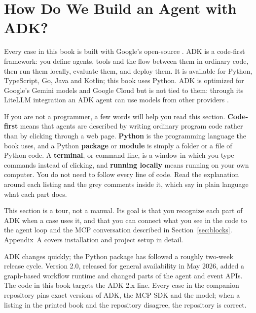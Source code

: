 
\section{How Do We Build an Agent with ADK?}
\label{sec:adk}

Every case in this book is built with Google's open-source . ADK is a code-first framework: you define agents, tools and the flow between them in ordinary code, then run them locally, evaluate them, and deploy them. It is available for Python, TypeScript, Go, Java and Kotlin; this book uses Python. ADK is optimized for Google's Gemini models and Google Cloud but is not tied to them: through its LiteLLM integration an ADK agent can use models from other providers \citep{adkdocs}.

If you are not a programmer, a few words will help you read this section. \textbf{Code-first} means that agents are described by writing ordinary program code rather than by clicking through a web page. \textbf{Python} is the programming language the book uses, and a Python \textbf{package} or \textbf{module} is simply a folder or a file of Python code. A \textbf{terminal}, or command line, is a window in which you type commands instead of clicking, and \textbf{running locally} means running on your own computer. You do not need to follow every line of code. Read the explanation around each listing and the grey comments inside it, which say in plain language what each part does.


This section is a tour, not a manual. Its goal is that you recognize each part of ADK when a case uses it, and that you can connect what you see in the code to the agent loop and the MCP conversation described in Section~\ref{sec:blocks}. Appendix~A covers installation and project setup in detail.

\begin{versionnote}
ADK changes quickly; the Python package has followed a roughly two-week release cycle. Version 2.0, released for general availability in May 2026, added a graph-based workflow runtime and changed parts of the agent and event APIs. The code in this book targets the ADK 2.x line. Every case in the companion repository pins exact versions of ADK, the MCP SDK and the model; when a listing in the printed book and the repository disagree, the repository is correct.
\end{versionnote}

